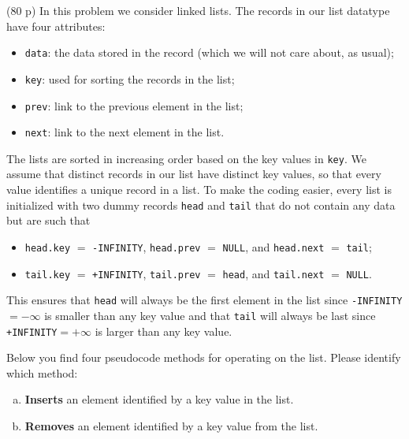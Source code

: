\documentclass{jn-pset}
\begin{document}
\begin{problem}
  (80 p)
  In this problem we consider linked lists.
  The records in our list datatype have four attributes:
  \begin{itemize}
  \item
    \verb+data+: the data stored in the record (which we will not care about, as usual);
    
  \item
    \verb+key+: used for sorting the records in the list;
    
  \item
    \verb+prev+: link to the previous element in the list;
    
  \item
    \verb+next+: link to the next element in the list.
    
  \end{itemize}
  The lists are sorted in increasing order based on the key values in
  \verb+key+.
  We assume that distinct records in our list have distinct
  key values, so that every value identifies a unique record in a list.
  To make the coding easier, every list is initialized with two
  dummy records  
  \verb+head+
  and
  \verb+tail+
  that do not contain any data but are
  such that
  \begin{itemize}
  \item
    \verb+head.key+ $=$ \verb+-INFINITY+,
    \verb+head.prev+ $=$ \verb+NULL+,
    and
    \verb+head.next+ $=$ \verb+tail+;
    
  \item
    \verb+tail.key+ $=$ \verb|+INFINITY|,
    \verb+tail.prev+ $=$ \verb+head+,
    and
    \verb+tail.next+ $=$ \verb+NULL+.
  \end{itemize}
  This ensures that \verb+head+ will always be the first element
  in the list since
  \verb|-INFINITY|$= - \infty$ is smaller than any key value
  and that 
  \verb+tail+ will always be last  since
  \verb|+INFINITY|$= +\infty$ is larger than any key value.

  Below you find four pseudocode methods for operating on the list.
  Please identify which method:
  \begin{enumerate}[(a)]
  \item
    \textbf{Inserts} an element
    identified by a key value
    in the list.
    
  \item
    \textbf{Removes} an element
    identified by a key value
    from the list.


\end{enumerate}
\end{problem}
\end{document}
